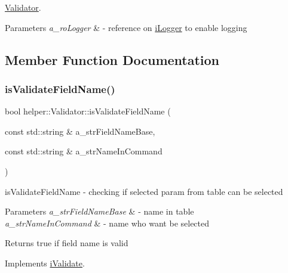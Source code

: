 \mbox{\hyperlink{classhelper_1_1_validator}{Validator}}. 


\begin{DoxyParams}{Parameters}
{\em a\+\_\+ro\+Logger} & -\/ reference on \mbox{\hyperlink{classi_logger}{i\+Logger}} to enable logging \\
\hline
\end{DoxyParams}


\subsection{Member Function Documentation}
\mbox{\label{classhelper_1_1_validator_ab0e104f0d9f8701af8b9b7980ea13ec4}} 
\subsubsection{\texorpdfstring{isValidateFieldName()}{isValidateFieldName()}}
{\footnotesize\ttfamily bool helper\+::\+Validator\+::is\+Validate\+Field\+Name (\begin{DoxyParamCaption}\item[{const std\+::string \&}]{a\+\_\+str\+Field\+Name\+Base,  }\item[{const std\+::string \&}]{a\+\_\+str\+Name\+In\+Command }\end{DoxyParamCaption})\hspace{0.3cm}{\ttfamily [virtual]}}



is\+Validate\+Field\+Name -\/ checking if selected param from table can be selected 


\begin{DoxyParams}{Parameters}
{\em a\+\_\+str\+Field\+Name\+Base} & -\/ name in table \\
\hline
{\em a\+\_\+str\+Name\+In\+Command} & -\/ name who want be selected \\
\hline
\end{DoxyParams}
\begin{DoxyReturn}{Returns}
true if field name is valid 
\end{DoxyReturn}


Implements \mbox{\hyperlink{classi_validate}{i\+Validate}}.

\mbox{\label{classhelper_1_1_validator_ac2ff8db85b517ac2a1ccd4e20ec13889}} 
